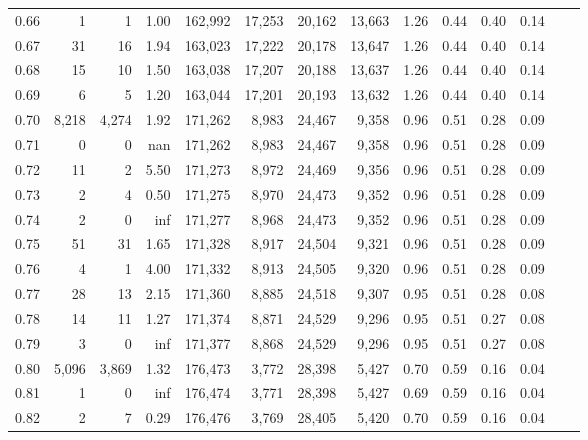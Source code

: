\begin{tabular}{rrrrrrrrrrrrrr}
0.66 &       1 &      1 &    1.00 &  162,992 &   17,253 &  20,162 &  13,663 &  1.26 &  0.44 &  0.40 &      0.14 \\
0.67 &      31 &     16 &    1.94 &  163,023 &   17,222 &  20,178 &  13,647 &  1.26 &  0.44 &  0.40 &      0.14 \\
0.68 &      15 &     10 &    1.50 &  163,038 &   17,207 &  20,188 &  13,637 &  1.26 &  0.44 &  0.40 &      0.14 \\
0.69 &       6 &      5 &    1.20 &  163,044 &   17,201 &  20,193 &  13,632 &  1.26 &  0.44 &  0.40 &      0.14 \\
0.70 &   8,218 &  4,274 &    1.92 &  171,262 &    8,983 &  24,467 &   9,358 &  0.96 &  0.51 &  0.28 &      0.09 \\
0.71 &       0 &      0 &     nan &  171,262 &    8,983 &  24,467 &   9,358 &  0.96 &  0.51 &  0.28 &      0.09 \\
0.72 &      11 &      2 &    5.50 &  171,273 &    8,972 &  24,469 &   9,356 &  0.96 &  0.51 &  0.28 &      0.09 \\
0.73 &       2 &      4 &    0.50 &  171,275 &    8,970 &  24,473 &   9,352 &  0.96 &  0.51 &  0.28 &      0.09 \\
0.74 &       2 &      0 &     inf &  171,277 &    8,968 &  24,473 &   9,352 &  0.96 &  0.51 &  0.28 &      0.09 \\
0.75 &      51 &     31 &    1.65 &  171,328 &    8,917 &  24,504 &   9,321 &  0.96 &  0.51 &  0.28 &      0.09 \\
0.76 &       4 &      1 &    4.00 &  171,332 &    8,913 &  24,505 &   9,320 &  0.96 &  0.51 &  0.28 &      0.09 \\
0.77 &      28 &     13 &    2.15 &  171,360 &    8,885 &  24,518 &   9,307 &  0.95 &  0.51 &  0.28 &      0.08 \\
0.78 &      14 &     11 &    1.27 &  171,374 &    8,871 &  24,529 &   9,296 &  0.95 &  0.51 &  0.27 &      0.08 \\
0.79 &       3 &      0 &     inf &  171,377 &    8,868 &  24,529 &   9,296 &  0.95 &  0.51 &  0.27 &      0.08 \\
0.80 &   5,096 &  3,869 &    1.32 &  176,473 &    3,772 &  28,398 &   5,427 &  0.70 &  0.59 &  0.16 &      0.04 \\
0.81 &       1 &      0 &     inf &  176,474 &    3,771 &  28,398 &   5,427 &  0.69 &  0.59 &  0.16 &      0.04 \\
0.82 &       2 &      7 &    0.29 &  176,476 &    3,769 &  28,405 &   5,420 &  0.70 &  0.59 &  0.16 &      0.04 \\

\end{tabular}
